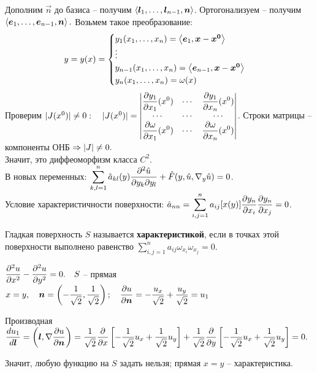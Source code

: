 \documentclass[../main.tex]{subfiles}
\begin{document}
Дополним $\vec{n}$ до базиса -- получим $\left\langle \boldsymbol{l}_1,\dots,\boldsymbol{l}_{n-1},\boldsymbol{n} \right\rangle$. Ортогонализуем -- получим $\left\langle \boldsymbol{e}_1,\dots,\boldsymbol{e}_{n-1},\boldsymbol{n} \right\rangle.$ Возьмем такое преобразование:
\[ y = y(x) = \begin{cases} y_1(x_1,\dots,x_n) = \left\langle \boldsymbol{e}_1, \boldsymbol{x}-\boldsymbol{x^0} \right\rangle \\ \vdots \\ y_{n-1}(x_1,\dots,x_n) = \left\langle \boldsymbol{e}_{n-1}, \boldsymbol{x}-\boldsymbol{x^0} \right\rangle \\ y_n(x_1,\dots,x_n) = \omega(x) \end{cases}\]
Проверим $|J(x^0)|\not=0: \quad |J(x^0)| = 
\begin{vmatrix} 
\displaystyle\frac{\partial y_1}{\partial x_1}(x^0) & \cdots & \displaystyle\frac{\partial y_1}{\partial x_n}(x^0) \\
\cdots &\cdots &\cdots \\
\displaystyle\frac{\partial \omega}{\partial x_1}(x^0) & \cdots & \displaystyle\frac{\partial \omega}{\partial x_n}(x^0) \\
\end{vmatrix} $. Строки матрицы -- компоненты ОНБ $\Rightarrow |J|\not= 0.$\\
Значит, это диффеоморфизм класса $C^2$.\\
В новых переменных: $\displaystyle\sum\limits_{k,l=1}^{n}\hat{a}_{kl}(y)\displaystyle\frac{\partial^2 \hat{u}}{\partial y_k\partial y_l} + \hat{F}(y, \hat{u}, \nabla_y \hat{u}) = 0 $.\\
Условие характеристичности поверхности: $\hat{a}_{nn} = \displaystyle\sum\limits_{i,j=1}^{n} a_{ij}[x(y)]\displaystyle\frac{\partial y_n}{\partial x_i}\displaystyle\frac{\partial y_n}{\partial x_j} = 0$.

\begin{definition}
Гладкая поверхность $S$ называется {\bf характеристикой}, если в точках этой поверхности выполнено равенство  $\displaystyle\sum\limits_{i,j=1}^{n}a_{ij}\omega_{x_i}\omega_{x_{j}} = 0$.
\end{definition}

\begin{example}
$\displaystyle\frac{\partial^{2} u}{\partial x^{2}} - \displaystyle\frac{\partial^{2} u}{\partial y^{2}} = 0.\quad S$ -- прямая $x=y, \quad \boldsymbol{n} = \left(-\dfrac1{\sqrt{2}}, \dfrac1{\sqrt{2}}\right);\quad \displaystyle\frac{\partial u}{\partial \boldsymbol{n}} = -\dfrac{u_x}{\sqrt2} + \dfrac{u_y}{\sqrt2} = u_1$

Производная $\displaystyle\frac{d u_1}{d \boldsymbol l} = \left(\boldsymbol{l}, \nabla\displaystyle\frac{\partial u}{\partial \boldsymbol{n}}\right) = \dfrac1{\sqrt{2}}\displaystyle\frac{\partial }{\partial x}\left[-\dfrac1{\sqrt2}u_x + \dfrac1{\sqrt{2}}u_y\right] + \dfrac1{\sqrt{2}}\displaystyle\frac{\partial }{\partial y}\left[-\dfrac1{\sqrt2}u_x + \dfrac1{\sqrt{2}}u_y\right] = 0.$

Значит, любую функцию на $S$ задать нельзя; прямая $x=y$ -- характеристика.
\end{example}
\vspace{5pt}
\end{document}
